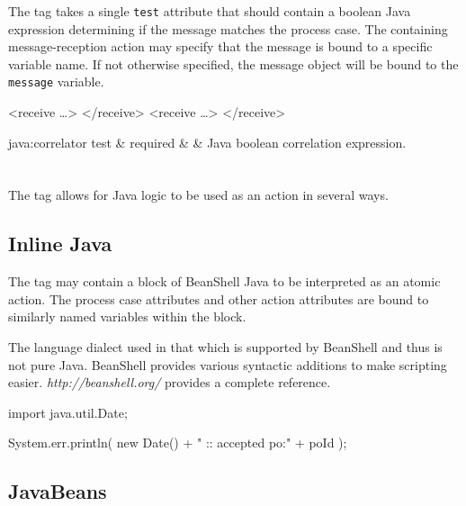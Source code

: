 The  tag takes a single \verb|test| attribute
that should contain a boolean Java expression determining if
the message matches the process case.  The containing message-reception
action may specify that the message is bound to a specific variable
name.  If not otherwise specified, the message object will be
bound to the \verb|message| variable. 

\begin{codelisting}
<receive \dots>
</receive>
<receive  \dots>
</receive>
\end{codelisting}

\begin{attrDefs}{java:correlator}
test		&	required	&			& Java boolean correlation expression. \\
\end{attrDefs}

\section{}

The  tag allows for Java logic to be used
as an action in several ways.

\subsection{Inline Java}

The  tag may contain a block of BeanShell Java
to be interpreted as an atomic action.  The process case attributes
and other action attributes are bound to similarly named variables
within the block.

The language dialect used in that which is supported by BeanShell
and thus is not pure Java.  BeanShell provides various syntactic
additions to make scripting easier.  \emph{http://beanshell.org/}
provides a complete reference.

\begin{codelisting}
    import java.util.Date;

    System.err.println( new Date() + " :: accepted po:" + poId );
\end{codelisting}

\subsection{JavaBeans}

